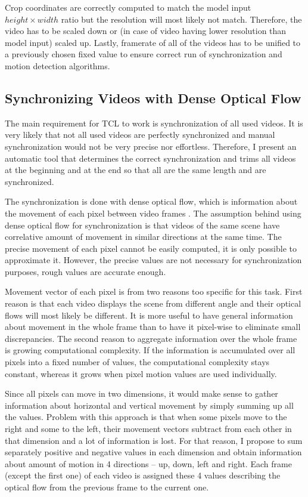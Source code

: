 Crop coordinates are correctly computed to match the model input $height \times width$ ratio but the resolution will most likely not match. Therefore, the video has to be scaled down or (in case of video having lower resolution than model input) scaled up. Lastly, framerate of all of the videos has to be unified to a previously chosen fixed value to ensure correct run of synchronization and motion detection algorithms.

\subsection{\label{sec:dataset-sync}Synchronizing Videos with Dense Optical Flow}

The main requirement for TCL to work is synchronization of all used videos. It is very likely that not all used videos are perfectly synchronized and manual synchronization would not be very precise nor effortless. Therefore, I present an automatic tool that determines the correct synchronization and trims all videos at the beginning and at the end so that all are the same length and are synchronized.

The synchronization is done with dense optical flow, which is information about the movement of each pixel between video frames \cite{HORN1981185}. The assumption behind using dense optical flow for synchronization is that videos of the same scene have correlative amount of movement in similar directions at the same time. The precise movement of each pixel cannot be easily computed, it is only possible to approximate it. However, the precise values are not necessary for synchronization purposes, rough values are accurate enough.

Movement vector of each pixel is from two reasons too specific for this task. First reason is that each video displays the scene from different angle and their optical flows will most likely be different. It is more useful to have general information about movement in the whole frame than to have it pixel-wise to eliminate small discrepancies. The second reason to aggregate information over the whole frame is growing computational complexity. If the information is accumulated over all pixels into a fixed number of values, the computational complexity stays constant, whereas it grows when pixel motion values are used individually. 

Since all pixels can move in two dimensions, it would make sense to gather information about horizontal and vertical movement by simply summing up all the values. Problem with this approach is that when some pixels move to the right and some to the left, their movement vectors subtract from each other in that dimension and a lot of information is lost. For that reason, I propose to sum separately positive and negative values in each dimension and obtain information about amount of motion in 4 directions -- up, down, left and right. Each frame (except the first one) of each video is assigned these 4 values describing the optical flow from the previous frame to the current one.


